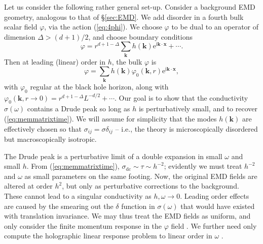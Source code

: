 \documentclass[10pt, oneside]{book}
\begin{document}
\begin{doublespace}
Let us consider the following rather general set-up.   Consider a background EMD geometry, analogous to that of \S\ref{sec:EMD}.  We add disorder in a fourth bulk scalar field $\varphi$, via the action (\ref{eq:4phi}).
We choose $\varphi$ to be dual to an operator of dimension $\Delta>(d+1)/2$, and choose boundary conditions \begin{equation}
\varphi = r^{d+1-\Delta} \sum_{\mathbf{k}} h(\mathbf{k}) \mathrm{e}^{\mathrm{i}\mathbf{k}\cdot\mathbf{x}} + \cdots .
\end{equation}
Then at leading (linear) order in $h$, the bulk $\varphi$ is \begin{equation}
\varphi = \sum_{\mathbf{k}} h(\mathbf{k}) \varphi_0(\mathbf{k},r) \mathrm{e}^{\mathrm{i}\mathbf{k}\cdot\mathbf{x}},
\end{equation}
with $\varphi_0$ regular at the black hole horizon, along with $\varphi_0(\mathbf{k},r\rightarrow 0) = r^{d+1-\Delta}L^{-d/2} + \cdots$.
Our goal is to show that the conductivity $\sigma(\omega)$ contains a Drude peak so long as $h$ is perturbatively small, and to recover (\ref{eq:memmatrixtime}).   We will assume for simplicity that the modes $h(\mathbf{k})$ are effectively chosen so that $\sigma_{ij} = \sigma \delta_{ij}$ -- i.e., the theory is microscopically disordered but macroscopically isotropic.

The Drude peak is a perturbative limit of a double expansion in small $\omega$ and small $h$.   From (\ref{eq:memmatrixtime}), $\sigma_{\mathrm{dc}} \sim \tau \sim h^{-2}$;  evidently we must treat $h^{-2}$ and $\omega$ as small parameters on the same footing.  Now, the original EMD fields are altered at order $h^2$, but only as perturbative corrections to the background.   These cannot lead to a singular conductivity as $h, \omega \rightarrow 0$.   Leading order effects are caused by the smearing out the $\delta$ function in $\sigma(\omega)$ that would have existed with translation invariance.   We may thus treat the EMD fields as uniform, and only consider the finite momentum response in the $\varphi$ field \cite{Blake:2013owa}.   We further need only compute the holographic linear response problem to linear order in $\omega$ \cite{Lucas:2015vna}.


\end{doublespace}
\end{document}
